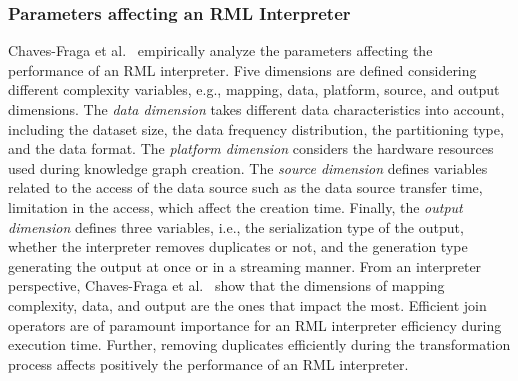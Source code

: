 \subsubsection{Parameters affecting an RML Interpreter}
Chaves-Fraga et al.~\citep{chaves2019what} empirically analyze the parameters affecting the performance of an RML interpreter.
Five dimensions are defined considering different complexity variables, e.g., mapping, data, platform, source, and output dimensions.
The \emph{data dimension} takes different data characteristics into account, including the dataset size, the data frequency distribution, the partitioning type, and the data format.
The \emph{platform dimension} considers the hardware resources used during knowledge graph creation.
The \emph{source dimension} defines variables related to the access of the data source such as the data source transfer time, limitation in the access, which affect the creation time.
Finally, the \emph{output dimension} defines three variables, i.e., the serialization type of the output, whether the interpreter removes duplicates or not, and the generation type generating the output at once or in a streaming manner.
From an interpreter perspective, Chaves-Fraga et al.~\citep{Chaves-FragaEIC19} show that the dimensions of mapping complexity, data, and output are the ones that impact the most.
Efficient join operators are of paramount importance for an RML interpreter efficiency during execution time.
Further, removing duplicates efficiently during the transformation process affects positively the performance of an RML interpreter.
